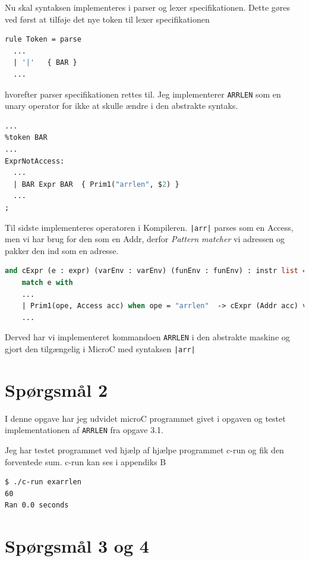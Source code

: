 \documentclass[danish,a4paper]{report}
\begin{document}
Nu skal syntaksen implementeres i parser og lexer specifikationen. Dette gøres ved først at tilføje det nye token til lexer specifikationen

\begin{lstlisting}[language=ML]
rule Token = parse
  ...
  | '|'   { BAR }
  ...
\end{lstlisting}

hvorefter parser specifikationen rettes til. Jeg implementerer \texttt{ARRLEN} som en unary operator for ikke at skulle ændre i den abstrakte syntaks.

\begin{lstlisting}[language=ML]
...
%token BAR
...
ExprNotAccess:
  ...
  | BAR Expr BAR  { Prim1("arrlen", $2) }
  ...
;
\end{lstlisting}

Til sidste implementeres operatoren i Kompileren. \texttt{|arr|} parses som en Access, men vi har brug for den som en Addr, derfor \textit{Pattern matcher} vi adressen og pakker den ind som en adresse.

\begin{lstlisting}[language=ML]
and cExpr (e : expr) (varEnv : varEnv) (funEnv : funEnv) : instr list = 
    match e with
    ...
    | Prim1(ope, Access acc) when ope = "arrlen"  -> cExpr (Addr acc) varEnv funEnv @ [ARRLEN]
    ...
\end{lstlisting}

Derved har vi implementeret kommandoen \texttt{ARRLEN} i den abstrakte maskine og gjort den tilgængelig i MicroC med syntaksen \texttt{|arr|}

\section*{Spørgsmål 2}

I denne opgave har jeg udvidet microC programmet givet i opgaven og testet implementationen af \texttt{ARRLEN} fra opgave 3.1.



Jeg har testet programmet ved hjælp af hjælpe programmet c-run og fik den forventede sum. c-run kan ses i appendiks B

\begin{lstlisting}[language=bash]
$ ./c-run exarrlen
60
Ran 0.0 seconds
\end{lstlisting}

\section*{Spørgsmål 3 og 4}
\end{document}
